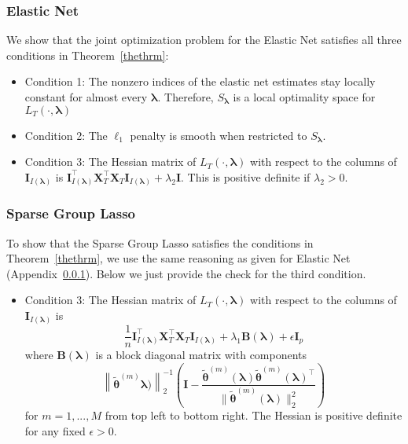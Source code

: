 \documentclass[12pt,letterpaper]{article}
\begin{document}
\subsubsection{Elastic Net}\label{enet_conditions}
We show that the joint optimization problem for the Elastic Net satisfies all three conditions in Theorem~\ref{thethrm}:
\begin{itemize}
\item[] Condition 1: The nonzero indices of the elastic net estimates stay locally constant for almost every $\boldsymbol{\lambda}$. Therefore, $S_{\boldsymbol{\lambda}}$ is a local optimality space for $L_T(\cdot, \boldsymbol{\lambda})$ \hfill {}
\item[] Condition 2: The $\ell_1$ penalty is smooth when restricted to $S_{\boldsymbol{\lambda}}$.\hfill {}
\item[] Condition 3: The Hessian matrix of $L_T(\cdot, \boldsymbol{\lambda})$ with respect to the columns of $\boldsymbol I_{I(\boldsymbol \lambda)}$ is $\boldsymbol I_{I(\boldsymbol \lambda)}^\top \boldsymbol{X}_{T}^\top \boldsymbol{X}_{T} \boldsymbol I_{I(\boldsymbol \lambda)} + \lambda_2 \boldsymbol{I}$. This is positive definite if $\lambda_2 > 0$. \hfill {}
\end{itemize}

\subsubsection{Sparse Group Lasso}
To show that the Sparse Group Lasso satisfies the conditions in Theorem~\ref{thethrm}, we use the same reasoning as given for Elastic Net (Appendix~\ref{enet_conditions}). Below we just provide the check for the third condition.
\begin{itemize}
\item[] Condition 3: The Hessian matrix of $L_T(\cdot, \boldsymbol{\lambda})$ with respect to the columns of $\boldsymbol I_{I(\boldsymbol \lambda)}$ is
\begin{equation}
\frac{1}{n} \boldsymbol I_{I(\boldsymbol \lambda)}^\top \boldsymbol{X}_{T}^\top \boldsymbol{X}_{T} \boldsymbol I_{I(\boldsymbol \lambda)}
+ \lambda_1 \boldsymbol{B}(\boldsymbol\lambda)
+ \epsilon \boldsymbol I_p
\end{equation}
where $\boldsymbol{B}(\boldsymbol\lambda)$ is a block diagonal matrix with components 
\begin{equation}
\left \| \tilde{\boldsymbol{\theta}}^{(m)}
\boldsymbol{\lambda})\right\|_2^{-1} 
\left (
\boldsymbol{I} - 
\frac{\tilde{\boldsymbol{\theta}}^{(m)}(\boldsymbol{\lambda})\tilde{\boldsymbol{\theta}}^{(m)}(\boldsymbol{\lambda})^\top}{\|\tilde{\boldsymbol{\theta}}^{(m)}(\boldsymbol{\lambda})\|_2^2}
\right)
\end{equation}
for $m=1,...,M$ from top left to bottom right. The Hessian is positive definite for any fixed $\epsilon > 0$.
\hfill {}
\end{itemize}
\end{document}
